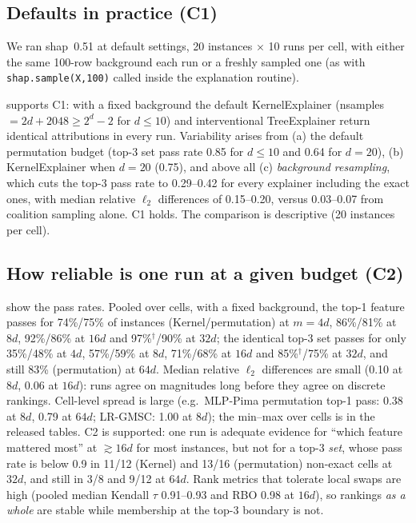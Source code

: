 \documentclass{article}
\begin{document}
\subsection{Defaults in practice (C1)}
We ran shap~0.51 at default settings, 20 instances $\times$ 10 runs per cell, with either the same 100-row background each run or a freshly sampled one (as with \texttt{shap.sample(X,100)} called inside the explanation routine).
\begin{table}[t]
\caption{Default shap explainers (0.51.0), 16 model--dataset cells, 20 instances $\times$ 10 runs. Pass = pair agreement $\ge0.9$. ``resampled'': a fresh random 100-row background each run. (Interventional TreeExplainer: trees only.)}\label{tab:deployed}
\centering\small\setlength{\tabcolsep}{4pt}

\end{table}
 supports C1: with a fixed background the default KernelExplainer (nsamples $=2d{+}2048\ge2^d{-}2$ for $d\le10$) and interventional TreeExplainer return identical attributions in every run. Variability arises from (a) the default permutation budget (top-3 set pass rate 0.85 for $d\le10$ and 0.64 for $d{=}20$), (b) KernelExplainer when $d{=}20$ (0.75), and above all (c) \emph{background resampling}, which cuts the top-3 pass rate to 0.29--0.42 for every explainer including the exact ones, with median relative $\ell_2$ differences of 0.15--0.20, versus 0.03--0.07 from coalition sampling alone. C1 holds. The comparison is descriptive (20 instances per cell).

\subsection{How reliable is one run at a given budget (C2)}
 show the pass rates. Pooled over cells, with a fixed background, the top-1 feature passes for 74\%/75\% of instances (Kernel/permutation) at $m=4d$, 86\%/81\% at $8d$, 92\%/86\% at $16d$ and 97\%$^\dagger$/90\% at $32d$; the identical top-3 set passes for only 35\%/48\% at $4d$, 57\%/59\% at $8d$, 71\%/68\% at $16d$ and 85\%$^\dagger$/75\% at $32d$, and still 83\% (permutation) at $64d$. Median relative $\ell_2$ differences are small (0.10 at $8d$, 0.06 at $16d$): runs agree on magnitudes long before they agree on discrete rankings. Cell-level spread is large (e.g.\ MLP-Pima permutation top-1 pass: 0.38 at $8d$, 0.79 at $64d$; LR-GMSC: 1.00 at $8d$); the min--max over cells is in the released tables. C2 is supported: one run is adequate evidence for ``which feature mattered most'' at $\gtrsim16d$ for most instances, but not for a top-3 \emph{set}, whose pass rate is below 0.9 in 11/12 (Kernel) and 13/16 (permutation) non-exact cells at $32d$, and still in 3/8 and 9/12 at $64d$. Rank metrics that tolerate local swaps are high (pooled median Kendall $\tau$ 0.91--0.93 and RBO 0.98 at $16d$), so rankings \emph{as a whole} are stable while membership at the top-3 boundary is not.
\end{document}
